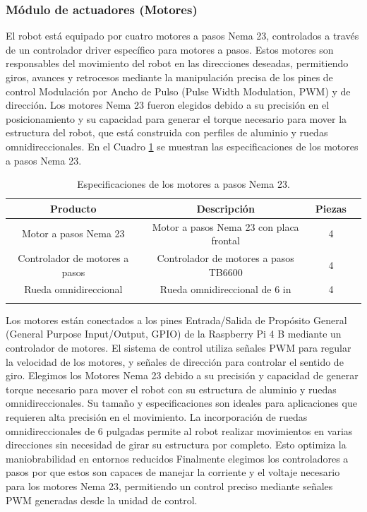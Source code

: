     \subsubsection{M\'odulo de actuadores (Motores)} %
    \label{ssub:modact}
    El robot est\'a equipado por cuatro motores a pasos Nema 23, controlados a trav\'es de
        un controlador driver espec\'ifico para motores a pasos. Estos motores son
        responsables del movimiento del robot en las direcciones deseadas, permitiendo giros,
        avances y retrocesos mediante la manipulaci\'on precisa de los pines de control Modulaci\'on por Ancho de Pulso (Pulse Width Modulation, PWM) y
        de direcci\'on.
    \vskip 0.5cm
    Los motores Nema 23 fueron elegidos debido a su precisi\'on en el posicionamiento y
        su capacidad para generar el torque necesario para mover la estructura del robot, que
        est\'a construida con perfiles de aluminio y ruedas omnidireccionales. En el Cuadro
        \ref{tab:motor} se muestran las especificaciones de los motores a pasos Nema 23.
    \vskip 0.5cm
    \begin{longtable}{|c|c|c|c|}
        \hline
        \rowcolor{gray}
        \textbf{Producto} & \textbf{Descripci\'on} & \textbf{Piezas} \\
        \hline
        Motor a pasos Nema 23 & Motor a pasos Nema 23 con placa frontal & 4  \\
        Controlador de motores a pasos & Controlador de motores a pasos TB6600 & 4  \\
        Rueda omnidireccional & Rueda omnidireccional de 6 in & 4  \\
        \hline
        \caption{Especificaciones de los motores a pasos Nema 23.}
        \label{tab:motor}
    \end{longtable}
    \vskip 0.5cm
    Los motores est\'an conectados a los pines Entrada/Salida de Prop\'osito General (General Purpose Input/Output, GPIO) de la Raspberry Pi 4 B mediante un
        controlador de motores. El sistema de control utiliza se\~nales PWM para regular la
        velocidad de los motores, y se\~nales de direcci\'on para controlar el sentido de giro.
    \vskip 0.5cm
    Elegimos los Motores Nema 23 debido a su precisi\'on y capacidad de generar torque
        necesario para mover el robot con su estructura de aluminio y ruedas
        omnidireccionales. Su tama\~no y especificaciones son ideales para aplicaciones que
        requieren alta precisi\'on en el movimiento.
    \vskip 0.5cm
    La incorporaci\'on de ruedas omnidireccionales de 6 pulgadas permite al robot realizar
        movimientos en varias direcciones sin necesidad de girar su estructura por completo.
        Esto optimiza la maniobrabilidad en entornos reducidos
    \vskip 0.5cm
    Finalmente elegimos los controladores a pasos por que estos son capaces de manejar
        la corriente y el voltaje necesario para los motores Nema 23, permitiendo un control
        preciso mediante se\~nales PWM generadas desde la unidad de control.
    \vskip 0.5cm
